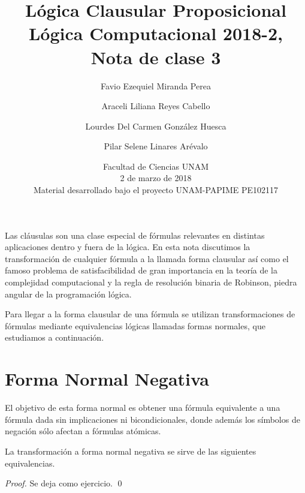 \documentclass[11pt,letterpaper]{article}
\title{L\'ogica Clausular Proposicional \\ 
L\'ogica Computacional 2018-2, Nota de clase 3}
\author{Favio Ezequiel Miranda Perea\and Araceli Liliana Reyes Cabello\and
Lourdes Del Carmen Gonz\'alez Huesca \and Pilar Selene Linares Ar\'evalo}
\date{Facultad de Ciencias UNAM \\ 2 de marzo de 2018 \\
Material desarrollado bajo el proyecto UNAM-PAPIME PE102117}
\begin{document}
\maketitle

Las cláusulas son una clase especial de fórmulas relevantes en distintas 
aplicaciones dentro y fuera de la lógica. En esta nota discutimos la 
transformación de cualquier fórmula a la llamada forma clausular así como el 
famoso problema de satisfacibilidad {\sat} de gran importancia en la teoría 
de la complejidad computacional y la regla de resolución binaria de 
Robinson, piedra angular de la programación lógica.


Para llegar a la forma clausular de una fórmula  se utilizan transformaciones 
de fórmulas mediante equivalencias lógicas llamadas formas normales, que 
estudiamos a continuación.


\section{Forma Normal Negativa}

El objetivo de esta forma normal es obtener una f\'ormula equivalente a una
f\'ormula dada sin implicaciones ni bicondicionales, donde además los símbolos 
de negación sólo afectan a f\'ormulas at\'omicas.


\noindent La transformación a forma normal negativa se sirve de las siguientes 
equivalencias.

\vspace*{-10pt}
\begin{proof} 
Se deja como ejercicio.
\qed
\end{proof}
\end{document}

